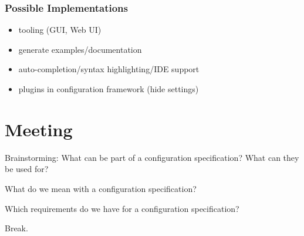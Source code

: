\begin{frame}
	\frametitle{Possible Implementations}
	\begin{itemize}
	\item tooling (GUI, Web UI)
	\item generate examples/documentation
	\item auto-completion/syntax highlighting/IDE support
	\item plugins in configuration framework (hide settings)
	\end{itemize}
\end{frame}




\section{Meeting}

\begin{assignment}
	\begin{task}
	Brainstorming: What can be part of a configuration specification?
	What can they be used for?
	\end{task}
\end{assignment}

\begin{assignment}
	\begin{task}
	What do we mean with a configuration specification?
	\end{task}

	\begin{task}
	Which requirements do we have for a configuration specification?
	\end{task}
\end{assignment}

\begin{assignment}
	\begin{task}
	Break.
	\end{task}
\end{assignment}




\nocite{raab2017introducing}

\appendix

\begin{frame}[allowframebreaks]
	
	
\end{frame}





